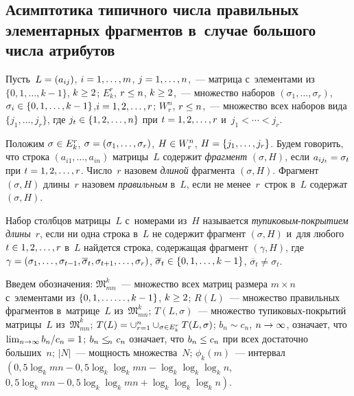 \begin{multicols}{2}
\section{Асимптотика типичного числа правильных элементарных 
фрагментов в~случае большого числа атрибутов}

  Пусть~$L\hm= (a_{ij})$, $i\hm= 1, \ldots , m$, $j\hm= 1, \ldots , n$,~--- 
матрица с~элементами из $\{0,1,\ldots , k-1\}$, $k\hm\geq 2$; $E_k^r$, $r\hm\leq 
n$, $k\hm \geq 2$,~--- множество наборов $(\sigma_1, \ldots , \sigma_r)$, 
$\sigma_i \hm\in \{0,1,\ldots , k-1\}$,$i\hm= 1,2,\ldots , r$; $W_r^n$, $r\hm\leq 
n$,~--- множество всех наборов вида $\{ j_1, \ldots , j_r\}$, где $j_t\hm\in 
\{1,2,\ldots , n\}$ при $t\hm= 1,2,\ldots , r$ и~$j_1< \cdots <j_r$.
  
  Положим $\sigma\hm\in E_k^r$, $\sigma\hm= (\sigma_1, \ldots , \sigma_r)$, 
$H\hm\in W_r^n$, $H\hm= \{ j_1, \ldots , j_r\}$. Будем говорить, что строка 
$(a_{i1}, \ldots , a_{in})$ матрицы~$L$ содержит \textit{фрагмент} $(\sigma, H)$, 
если $a_{ij_t}\hm= \sigma_t$ при $t\hm=1,2,\ldots , r$. Число~$r$ назовем 
\textit{длиной} фрагмента $(\sigma, H)$. Фрагмент $(\sigma,H)$ длины~$r$ 
назовем \textit{правильным} в~$L$, если не менее~$r$~строк в~$L$ содержат 
$(\sigma,H)$.
  
  Набор столбцов матрицы~$L$ с~номерами из~$H$ называется 
\textit{тупиковым}-\textit{покрытием длины}~$r$, если ни одна строка в~$L$ 
не содержит фрагмент $(\sigma, H)$ и~для любого $t\hm\in 1,2, \ldots , r$ в~$L$ найдется строка, 
содержащая фрагмент $(\gamma, H)$, где $\gamma\hm= (\sigma_1, \ldots 
,\sigma_{t-1}, \overline{\sigma}_t, \sigma_{t+1}, \ldots , \sigma_r)$, 
$\overline{\sigma}_t\hm\in \{0,1,\ldots , k-1\}$, $\overline{\sigma}_t \not= 
\sigma_t$.
  
  Введем обозначения: $\mathfrak{M}^k_{mn}$~--- множество всех матриц 
размера $m\times n$ с~элементами из $\{ 0,1,\ldots\linebreak \ldots , k-1\}$, $k\hm\geq 2$; 
$R(L)$~--- множество правильных фрагментов в~матрице~$L$ 
из~$\mathfrak{M}^k_{mn}$; $T(L,\sigma)$~--- множество ту\-пи\-ко\-вых-по\-кры\-тий 
матрицы~$L$ из~$\mathfrak{M}_{mn}^k$; $T(L)\hm= \cup^n_{r=1} 
\cup_{\sigma\in E_k^r} T(L,\sigma)$; $b_n\sim c_n$, $n\hm\to \infty$, означает, 
что $\lim_{n\to \infty} b_n/c_n\hm=1$; $b_n\hm\leq_{\!\!\!n}\ c_n$ означает, что 
$b_n\hm\leq c_n$ при всех достаточно больших~$n$; $\vert N\vert$~--- 
мощность множества~$N$; $\phi_k(m)$~--- интервал
$\left( 0{,}5\log_k mn -0{,}5\log_k \log_k mn -\log_k\log_k\log_k n\right.$,\linebreak
$\left.0{,}5\log_k mn- 0{,}5\log_k \log_k mn+\log_k\log_k\log_k n\right)$.
  

\end{multicols}
